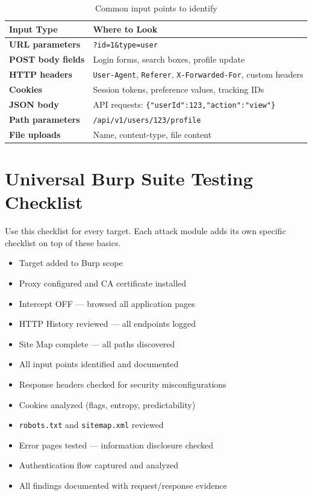 \begin{table}[H]
\centering
\caption{Common input points to identify}
\begin{tabularx}{\textwidth}{>{\bfseries}lX}
\toprule
Input Type & Where to Look \\
\midrule
URL parameters & \texttt{?id=1\&type=user} \\
POST body fields & Login forms, search boxes, profile update \\
HTTP headers & \texttt{User-Agent}, \texttt{Referer}, \texttt{X-Forwarded-For}, custom headers \\
Cookies & Session tokens, preference values, tracking IDs \\
JSON body & API requests: \texttt{\{"userId":123,"action":"view"\}} \\
Path parameters & \texttt{/api/v1/users/123/profile} \\
File uploads & Name, content-type, file content \\
\bottomrule
\end{tabularx}
\end{table}

\section{Universal Burp Suite Testing Checklist}

Use this checklist for every target. Each attack module adds its own specific checklist on top of these basics.

\begin{tcolorbox}[findingstyle, title={Universal Burp Checklist}]
\begin{itemize}
  \item[\checkbox] Target added to Burp scope
  \item[\checkbox] Proxy configured and CA certificate installed
  \item[\checkbox] Intercept OFF — browsed all application pages
  \item[\checkbox] HTTP History reviewed — all endpoints logged
  \item[\checkbox] Site Map complete — all paths discovered
  \item[\checkbox] All input points identified and documented
  \item[\checkbox] Response headers checked for security misconfigurations
  \item[\checkbox] Cookies analyzed (flags, entropy, predictability)
  \item[\checkbox] \texttt{robots.txt} and \texttt{sitemap.xml} reviewed
  \item[\checkbox] Error pages tested — information disclosure checked
  \item[\checkbox] Authentication flow captured and analyzed
  \item[\checkbox] All findings documented with request/response evidence
\end{itemize}
\end{tcolorbox}
